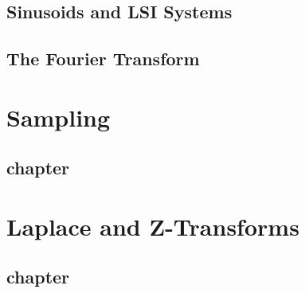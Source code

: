 \documentclass{scrbook}
\begin{document}
\chapter{Sinusoids and LSI Systems}





\chapter{The Fourier Transform}






\part{Sampling}
\chapter{chapter}

















\part{Laplace and Z-Transforms}
\chapter{chapter}














\end{document}
